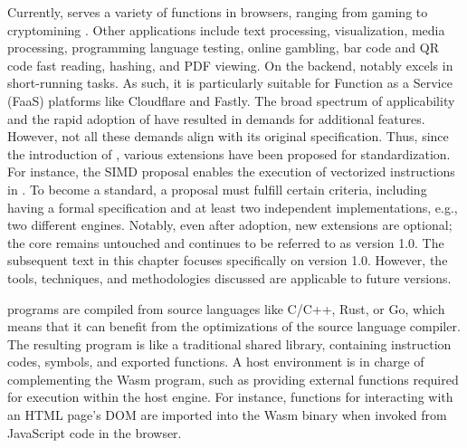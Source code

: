 Currently, \Wasm serves a variety of functions in browsers, ranging from gaming to cryptomining \cite{Hilbig2021AnES}. 
Other applications include text processing, visualization, media processing, programming language testing, online gambling, bar code and QR code fast reading, hashing, and PDF viewing. 
On the backend, \Wasm notably excels in short-running tasks. 
As such, it is particularly suitable for Function as a Service (FaaS) platforms like Cloudflare and Fastly.
The broad spectrum of applicability and the rapid adoption of \Wasm have resulted in demands for additional features. 
However, not all these demands align with its original specification.
Thus, since the introduction of \Wasm, various extensions have been proposed for standardization. 
For instance, the SIMD proposal enables the execution of vectorized instructions in \Wasm. 
To become a standard, a proposal must fulfill certain criteria, including having a formal specification and at least two independent implementations, e.g., two different engines. 
Notably, even after adoption, new extensions are optional; the core \Wasm remains untouched and continues to be referred to as version 1.0. 
The subsequent text in this chapter focuses specifically on \Wasm version 1.0. 
However, the tools, techniques, and methodologies discussed are applicable to future \Wasm versions.







\Wasm programs are compiled from source languages like C/C++, Rust, or Go, which means that it can benefit from the optimizations of the source language compiler.
The resulting \wasm program is like a traditional shared library, containing instruction codes, symbols, and exported functions. 
A host environment is in charge of complementing the Wasm program, such as providing external functions required for execution within the host engine. 
For instance, functions for interacting with an HTML page's DOM are imported into the Wasm binary when invoked from JavaScript code in the browser. 


